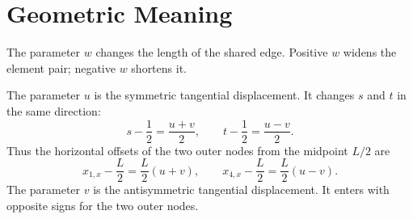 \documentclass[11pt]{article}
\begin{document}
\section{Geometric Meaning}

The parameter \(w\) changes the length of the shared edge. Positive \(w\)
widens the element pair; negative \(w\) shortens it.

The parameter \(u\) is the symmetric tangential displacement. It changes
\(s\) and \(t\) in the same direction:
\[
    s-\frac{1}{2} = \frac{u+v}{2},
    \qquad
    t-\frac{1}{2} = \frac{u-v}{2}.
\]
Thus the horizontal offsets of the two outer nodes from the midpoint
\(L/2\) are
\[
    x_{1,x}-\frac{L}{2}
      = \frac{L}{2}(u+v),
    \qquad
    x_{4,x}-\frac{L}{2}
      = \frac{L}{2}(u-v).
\]
The parameter \(v\) is the antisymmetric tangential displacement. It enters
with opposite signs for the two outer nodes.
\end{document}

